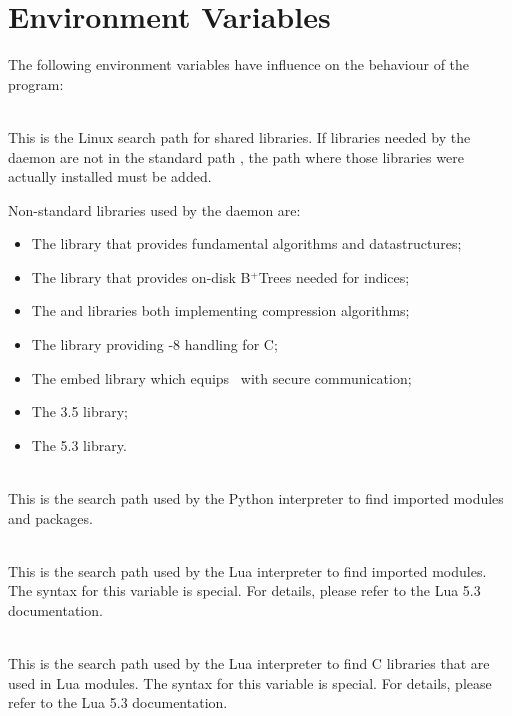 \section{Environment Variables}
The following environment variables have influence
on the behaviour of the program:

\\
This is the Linux search path for shared libraries.
If libraries needed by the daemon are not in
the standard path , the path
where those libraries were actually installed
must be added.

\begin{minipage}{\textwidth}
Non-standard libraries used by the daemon are:

\begin{minipage}{\textwidth}
\begin{itemize}
\item The  library that provides
      fundamental algorithms and datastructures;
\item The  library that provides
      on-disk B$^+$Trees needed for indices;
\item The  and  libraries
      both implementing compression algorithms;
\item The  library providing -8
      handling for C;
\item The embed library which equips
      \nowdb\ with secure communication;    
\item The  3.5 library;
\item The  5.3 library.
\end{itemize}
\end{minipage}

\\
This is the search path used by the Python interpreter
to find imported modules and packages.

\\
This is the search path used by the Lua interpreter
to find imported modules.
The syntax for this variable is special.
For details, please refer to the Lua 5.3 documentation.

\\
This is the search path used by the Lua interpreter
to find C libraries that are used in Lua modules.
The syntax for this variable is special.
For details, please refer to the Lua 5.3 documentation.


\end{minipage}
